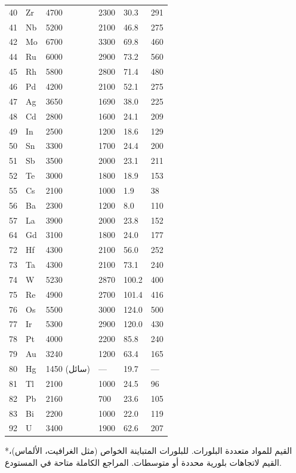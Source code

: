 \documentclass[11pt,a4paper]{article}
\begin{document}
\begin{otherlanguage}{arabic}
\begin{longtable}{p{0.8cm}p{1.2cm}p{2.2cm}p{2.2cm}p{2.2cm}p{2.2cm}}
			40 & Zr & 4700 & 2300 & 30.3 & 291 \\
			41 & Nb & 5200 & 2100 & 46.8 & 275 \\
			42 & Mo & 6700 & 3300 & 69.8 & 460 \\
			44 & Ru & 6000 & 2900 & 73.2 & 560 \\
			45 & Rh & 5800 & 2800 & 71.4 & 480 \\
			46 & Pd & 4200 & 2100 & 52.1 & 275 \\
			47 & Ag & 3650 & 1690 & 38.0 & 225 \\
			48 & Cd & 2800 & 1600 & 24.1 & 209 \\
			49 & In & 2500 & 1200 & 18.6 & 129 \\
			50 & Sn & 3300 & 1700 & 24.4 & 200 \\
			51 & Sb & 3500 & 2000 & 23.1 & 211 \\
			52 & Te & 3000 & 1800 & 18.9 & 153 \\
			55 & Cs & 2100 & 1000 & 1.9 & 38 \\
			56 & Ba & 2300 & 1200 & 8.0 & 110 \\
			57 & La & 3900 & 2000 & 23.8 & 152 \\
			64 & Gd & 3100 & 1800 & 24.0 & 177 \\
			72 & Hf & 4300 & 2100 & 56.0 & 252 \\
			73 & Ta & 4300 & 2100 & 73.1 & 240 \\
			74 & W  & 5230 & 2870 & 100.2 & 400 \\
			75 & Re & 4900 & 2700 & 101.4 & 416 \\
			76 & Os & 5500 & 3000 & 124.0 & 500 \\
			77 & Ir & 5300 & 2900 & 120.0 & 430 \\
			78 & Pt & 4000 & 2200 & 85.8 & 240 \\
			79 & Au & 3240 & 1200 & 63.4 & 165 \\
			80 & Hg & 1450 (سائل) & --- & 19.7 & --- \\
			81 & Tl & 2100 & 1000 & 24.5 & 96 \\
			82 & Pb & 2160 & 700 & 23.6 & 105 \\
			83 & Bi & 2200 & 1000 & 22.0 & 119 \\
			92 & U  & 3400 & 1900 & 62.6 & 207 \\
			\bottomrule
		\end{longtable}
		*القيم للمواد متعددة البلورات. للبلورات المتباينة الخواص (مثل الغرافيت، الألماس)، القيم لاتجاهات بلورية محددة أو متوسطات. المراجع الكاملة متاحة في المستودع.
		

\end{otherlanguage}
\end{document}
